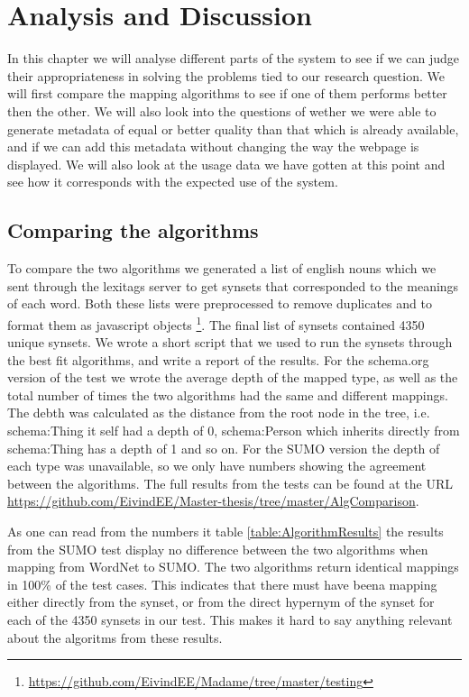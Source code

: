 
\chapter{Analysis and Discussion} %

\label{AnalysisAndDiscussion}


In this chapter we will analyse different parts of the system to see if we can judge their appropriateness in solving the
problems tied to our research question.
We will first compare the mapping algorithms to see if one of them performs better then the other.
We will also look into the questions of wether we were able to generate metadata of equal or better quality than that
which is already available, and if we can add this metadata without changing the way the webpage is displayed.
We will also look at the usage data we have gotten at this point and see how it corresponds with the expected use of the system.

\section{Comparing the algorithms}
\label{ComparingAlgorithms}
To compare the two algorithms we generated a list of english nouns
which we sent through the lexitags server to get synsets that corresponded to the meanings of each word.
Both these lists were preprocessed to remove duplicates and to format them as javascript objects
\footnote{\url{https://github.com/EivindEE/Madame/tree/master/testing}}.
The final list of synsets contained 4350 unique synsets.
We wrote a short script that we used to run the synsets through the best fit algorithms,
and write a report of the results.
For the schema.org version of the test we wrote the average depth of the mapped type,
as well as the total number of times the two algorithms had the same and different mappings.
The debth was calculated as the distance from the root node in the tree,
i.e. schema:Thing it self had a depth of 0,
schema:Person which inherits directly from schema:Thing has a depth of 1 and so on.
For the SUMO version the depth of each type was unavailable,
so we only have numbers showing the agreement between the algorithms.
The full results from the tests can be found at the URL \url{https://github.com/EivindEE/Master-thesis/tree/master/AlgComparison}.

As one can read from the numbers it table \ref{table:AlgorithmResults} the results from the SUMO test
display no difference between the two algorithms when mapping from WordNet to SUMO.
The two algorithms return identical mappings in 100\% of the test cases.
This indicates that there must have beena mapping either directly from the synset,
or from the direct hypernym of the synset for each of the 4350 synsets in our test.
This makes it hard to say anything relevant about the algoritms from these results.

